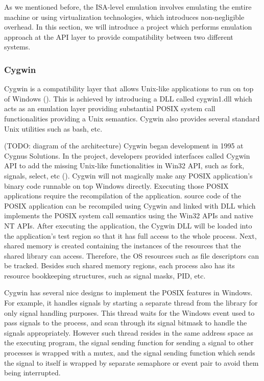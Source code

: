 As we mentioned before, the ISA-level emulation involves emulating the emtire machine or using virtualization technologies, which introduces non-negligible overhead. In this section, we will introduce a project which performs emulation approach at the API layer to provide compatibility between two different systems.

\subsubsection{Cygwin}


Cygwin is a compatibility layer that allows Unix-like applications to run on top of Windows (\cite{enwikicygwin}). This is achieved by introducing a DLL called cygwin1.dll which acts as an emulation layer providing substantial POSIX system call functionalities providing a Unix semantics. Cygwin also provides several standard Unix utilities such as bash, etc.

(TODO: diagram of the architecture)
Cygwin began development in 1995 at Cygnus Solutions. In the project, developers provided interfaces called Cygwin API to add the missing Unix-like functionalities in Win32 API, such as fork, signals, select, etc (\cite{Cygwin}). Cygwin will not magically make any POSIX application's binary code runnable on top  Windows directly. Executing those POSIX applications require the recompilation of the application. source code of the POSIX application can be recompiled using Cygwin and linked with DLL which implements the POSIX system call semantics using the Win32 APIs and native NT APIs. After executing the application, the Cygwin DLL will be loaded into the application's test region so that it has full access to the whole process. Next, shared memory is created containing the instances of the resources that the shared library can access. Therefore, the OS resources such as file descriptors can be tracked. Besides such shared memory regions, each process also has its resource bookkeeping structures, such as signal masks, PID, etc.

Cygwin has several nice designs to implement the POSIX features in Windows. For example, it handles signals by starting a separate thread from the library for only signal handling purposes. This thread waits for the Windows event used to pass signals to the process, and scan through its signal bitmask to handle the signals appropriately. However such thread resides in the same address space as the executing program, the signal sending function for sending a signal to other processes is wrapped with a mutex, and the signal sending function which sends the signal to itself is wrapped by separate semaphore or event pair to avoid them being interrupted. 

